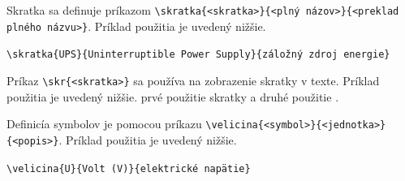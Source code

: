 \newpage
{}
\label{atch:skratky}
Skratka sa definuje príkazom \verb|\skratka{<skratka>}{<plný názov>}{<preklad plného názvu>}|. Príklad použitia je uvedený nižšie.

\verb|\skratka{UPS}{Uninterruptible Power Supply}{záložný zdroj energie}|

Príkaz \verb|\skr{<skratka>}| sa používa na zobrazenie skratky v texte. Príklad použitia je uvedený nižšie.
prvé použitie skratky  a druhé použitie .

Definicía symbolov je pomocou príkazu \verb|\velicina{<symbol>}{<jednotka>}{<popis>}|. Príklad použitia je uvedený nižšie.

\verb|\velicina{U}{Volt (V)}{elektrické napätie}|